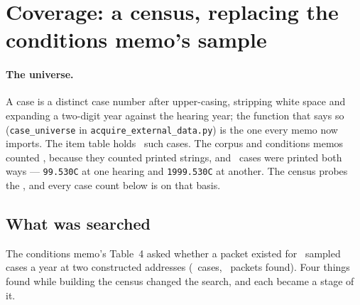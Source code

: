 \documentclass[11pt]{article}
\begin{document}
\clearpage
\tableofcontents
\newpage

\section{Coverage: a census, replacing the conditions memo's sample}
\label{sec:coverage}

\paragraph{The universe.} A case is a distinct case number after upper-casing, stripping
white space and expanding a two-digit year against the hearing year; the function that says so
(\texttt{case\_universe} in \texttt{acquire\_external\_data.py}) is the one every memo now
imports. The item table holds \ccUniverse\ such cases. The corpus and conditions memos counted
\ccCasesPrinted, because they counted printed strings, and \ccCaseMerges\ cases were printed
both ways --- \texttt{99.530C} at one hearing and \texttt{1999.530C} at another. The census
probes the \ccUniverse, and every case count below is on that basis.

\subsection{What was searched}

The conditions memo's Table~4 asked whether a packet existed for \ccOldPerYear\ sampled cases
a year at two constructed addresses (\ccOldProbed\ cases, \ccOldFound\ packets found). Four things found while building the census changed the search,
and each became a stage of it.
\end{document}
